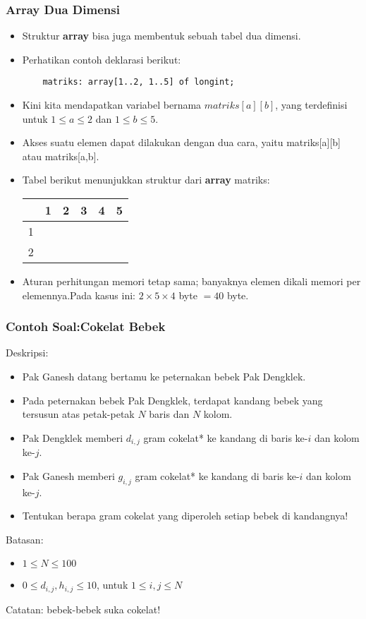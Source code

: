\documentclass{beamer}
\begin{document}
\begin{frame}[fragile]
\frametitle{Array Dua Dimensi}
\begin{itemize}
    \item Struktur \textbf{array} bisa juga membentuk sebuah tabel dua dimensi.
    \item Perhatikan contoh deklarasi berikut:
    \begin{lstlisting}
    matriks: array[1..2, 1..5] of longint;
    \end{lstlisting}
    \item Kini kita mendapatkan variabel bernama $matriks[a][b]$, yang terdefinisi untuk $1 \le a \le 2$ dan $1 \le b \le 5$.
    \item Akses suatu elemen dapat dilakukan dengan dua cara, yaitu matriks[a][b] atau matriks[a,b].
    \item Tabel berikut menunjukkan struktur dari \textbf{array} matriks:
    \begin{table}[h]
        \begin{tabular}{c|c|c|c|c|c|}
              & 1 & 2 & 3 & 4 & 5\\
            \hline 1 & & & & & \\
            \hline 2 & & & & & \\
            \hline
        \end{tabular}
    \end{table}
    \item Aturan perhitungan memori tetap sama; banyaknya elemen dikali memori per elemennya.\newline Pada kasus ini: $2 \times 5 \times 4$ byte $= 40$ byte.
\end{itemize}
\end{frame}

\begin{frame}
\frametitle{Contoh Soal:\newline Cokelat Bebek}
Deskripsi:
\begin{itemize}
    \item Pak Ganesh datang bertamu ke peternakan bebek Pak Dengklek.
    \item Pada peternakan bebek Pak Dengklek, terdapat kandang bebek yang tersusun atas petak-petak $N$ baris dan $N$ kolom.
    \item Pak Dengklek memberi $d_{i,j}$ gram cokelat* ke kandang di baris ke-$i$ dan kolom ke-$j$.
    \item Pak Ganesh memberi $g_{i,j}$ gram cokelat* ke kandang di baris ke-$i$ dan kolom ke-$j$.
    \item Tentukan berapa gram cokelat yang diperoleh setiap bebek di kandangnya!
\end{itemize}
Batasan:
\begin{itemize}
    \item $1 \le N \le 100$
    \item $0 \le d_{i,j}, h_{i,j} \le 10$, untuk $1 \le i,j \le N$
\end{itemize}

\tiny *Catatan: bebek-bebek suka cokelat!
\end{frame}
\end{document}
